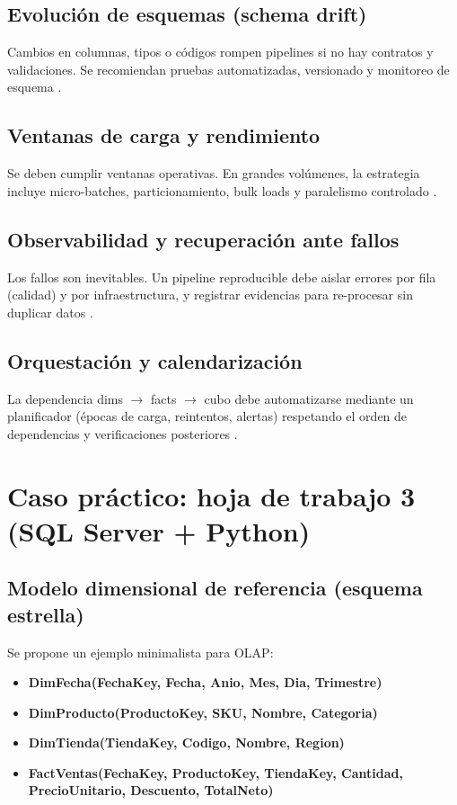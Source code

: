 \documentclass[12pt]{article}
\begin{document}
\subsection{Evolución de esquemas (schema drift)}
Cambios en columnas, tipos o códigos rompen pipelines si no hay contratos y validaciones. Se recomiendan pruebas automatizadas, versionado y monitoreo de esquema \cite{kimball_etl_toolkit}.

\subsection{Ventanas de carga y rendimiento}
Se deben cumplir ventanas operativas. En grandes volúmenes, la estrategia incluye micro-batches, particionamiento, bulk loads y paralelismo controlado \cite{kimball_etl_toolkit}.

\subsection{Observabilidad y recuperación ante fallos}
Los fallos son inevitables. Un pipeline reproducible debe aislar errores por fila (calidad) y por infraestructura, y registrar evidencias para re-procesar sin duplicar datos \cite{kimball_etl_toolkit}.

\subsection{Orquestación y calendarización}
La dependencia dims $\rightarrow$ facts $\rightarrow$ cubo debe automatizarse mediante un planificador (épocas de carga, reintentos, alertas) respetando el orden de dependencias y verificaciones posteriores \cite{kimball_etl_toolkit}.

\section{Caso práctico: hoja de trabajo 3 (SQL Server + Python)}
\subsection{Modelo dimensional de referencia (esquema estrella)}
Se propone un ejemplo minimalista para OLAP:

\begin{itemize}[leftmargin=*]
\item \textbf{DimFecha(FechaKey, Fecha, Anio, Mes, Dia, Trimestre)}
\item \textbf{DimProducto(ProductoKey, SKU, Nombre, Categoria)}
\item \textbf{DimTienda(TiendaKey, Codigo, Nombre, Region)}
\item \textbf{FactVentas(FechaKey, ProductoKey, TiendaKey, Cantidad, PrecioUnitario, Descuento, TotalNeto)}
\end{itemize}
\end{document}

